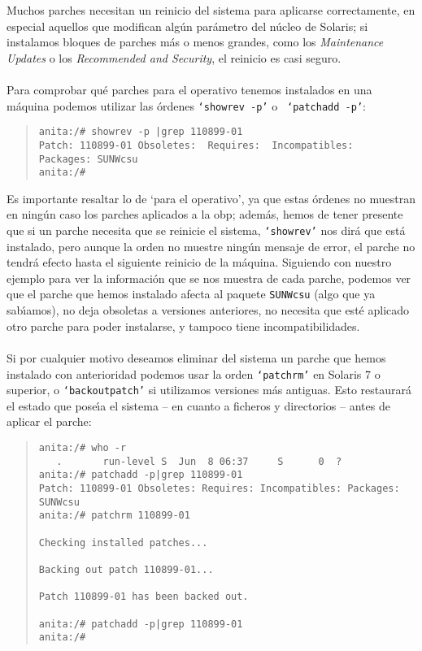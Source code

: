 Muchos parches necesitan un reinicio del sistema para aplicarse correctamente,
en especial aquellos que modifican alg\'un par\'ametro del n\'ucleo de Solaris;
si instalamos bloques de parches m\'as o menos grandes, como los {\it 
Maintenance Updates} o los {\it Recommended and Security}, el reinicio es casi
seguro.\\
\\Para comprobar qu\'e parches para el operativo tenemos instalados en una 
m\'aquina podemos utilizar las \'ordenes {\tt `showrev -p'} o {\tt 
`patchadd -p'}: 
\begin{quote}
\begin{verbatim}
anita:/# showrev -p |grep 110899-01
Patch: 110899-01 Obsoletes:  Requires:  Incompatibles:  Packages: SUNWcsu
anita:/# 
\end{verbatim}
\end{quote}
Es importante resaltar lo de `para el operativo', ya que estas \'ordenes no 
muestran en ning\'un caso los parches aplicados a la {\sc obp}; adem\'as, hemos
de tener presente que si un parche necesita que se reinicie el
sistema, {\tt `showrev'} nos dir\'a que est\'a instalado, pero aunque la
orden no muestre ning\'un mensaje de error, el parche no tendr\'a efecto hasta 
el siguiente reinicio de la m\'aquina. Siguiendo con nuestro ejemplo para
ver la informaci\'on que se nos muestra de cada parche, podemos ver que el 
parche que hemos instalado afecta al paquete {\tt SUNWcsu} (algo que ya 
sab\'{\i}amos), no deja obsoletas a versiones anteriores, no
necesita que est\'e aplicado otro parche para poder instalarse, y tampoco tiene
incompatibilidades.\\
\\Si por cualquier motivo deseamos eliminar del sistema un parche que hemos
instalado con an\-te\-rio\-ri\-dad podemos usar la orden {\tt `patchrm'} en 
Solaris 7 o superior, o {\tt `backoutpatch'} si utilizamos versiones m\'as 
antiguas. Esto restaurar\'a el estado que pose\'{\i}a el sistema -- en cuanto a 
ficheros y directorios -- antes de aplicar el parche:
\begin{quote}
\begin{verbatim}
anita:/# who -r
   .       run-level S  Jun  8 06:37     S      0  ?
anita:/# patchadd -p|grep 110899-01
Patch: 110899-01 Obsoletes: Requires: Incompatibles: Packages: SUNWcsu
anita:/# patchrm 110899-01

Checking installed patches...

Backing out patch 110899-01...

Patch 110899-01 has been backed out.

anita:/# patchadd -p|grep 110899-01
anita:/# 
\end{verbatim}
\end{quote}
